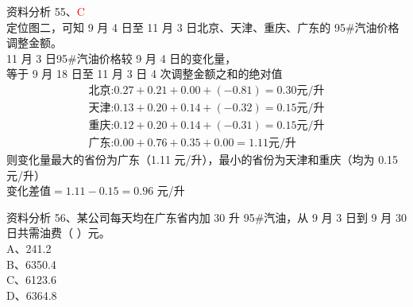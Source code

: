 \documentclass[aspectratio=169]{beamer}
\begin{document}
\begin{frame}[t]{资料分析}
    55、\textcolor{red}{C}\\
    {\small
    定位图二，可知 9 月 4 日至 11 月 3 日北京、天津、重庆、广东的 95\#汽油价格调整金额。\\
    11 月 3 日95\#汽油价格较 9 月 4 日的变化量，\\
    等于 9 月 18 日至 11 月 3 日 4 次调整金额之和的绝对值\\
    \begin{gather}
        \text{北京:} 0.27+0.21+0.00+(-0.81) = 0.30 \text{元/升}\\
        \text{天津:} 0.13+0.20+0.14+(-0.32) = 0.15 \text{元/升}\\
        \text{重庆:} 0.12+0.20+0.14+(-0.31) = 0.15 \text{元/升}\\
        \text{广东:} 0.00+0.76+0.35+0.00 = 1.11 \text{元/升}
    \end{gather}
    则变化量最大的省份为广东（1.11 元/升），最小的省份为天津和重庆（均为 0.15 元/升）\\
    变化差值$=1.11 - 0.15 = 0.96$ 元/升\\
    }
\end{frame}                           


\begin{frame}[t]{资料分析}
    56、某公司每天均在广东省内加 30 升 95\#汽油，从 9 月 3 日到 9 月 30 日共需油费（ ）元。\\
    A、241.2                                                                              \\
    B、6350.4                                                                             \\
    C、6123.6                                                                             \\
    D、6364.8                                                                             \\
\end{frame}                           
\end{document}

